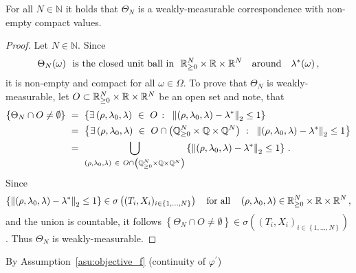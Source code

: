 \begin{lemma}
  \label{Theta_maes}
  For all $N\in\mathbb{N}$ it holds that 
  $\Theta_N$ is a weakly-measurable correspondence  with non-empty compact values.
\end{lemma}
\begin{proof}
  Let $N\in\mathbb{N}$. 
  Since 
  \begin{align*}
  \Theta_N(\omega)
  \ 
  \text{
  is the closed unit ball
  in
  }
  \ 
\R^N_{\ge 0}\times \R\times \R^N
\quad 
\text{around}
\quad 
  \lambda^*(\omega) 
  \,,
  \end{align*}
  it is non-empty and compact for all $\omega\in\Omega$.
  To prove that $\Theta_N$ is weakly-measurable,
  let 
  $
  O\subset
\mathbb{R}^N_{\ge 0}\times \mathbb{R}\times \mathbb{R}^N
  $
  be an open set and note, that
  \begin{align*}
    \left\{ 
      \Theta_N\cap O \neq \emptyset
    \right\}
    &
    \ 
    =
    \ 
    \left\{ 
      \exists
  \left( 
  \rho,\lambda_0,\lambda
  \right)
  \ 
  \in
  \ 
  O
\ 
\colon
\ 
\norm{
  \left( 
  \rho,\lambda_0,\lambda
  \right)
-\lambda^*}_2\le 1
    \right\}
    \\
    &
    \ 
    =
    \ 
    \left\{ 
      \exists
  \left( 
  \rho,\lambda_0,\lambda
  \right)
  \ 
  \in
  \ 
  O
  \cap
  \left( 
  \mathbb{Q}^N_{\ge 0}\times \mathbb{Q}\times \mathbb{Q}^N
  \right)
\ 
\colon
\ 
\norm{
  \left( 
  \rho,\lambda_0,\lambda
  \right)
-\lambda^*}_2\le 1
    \right\}
    \\
&
    \ 
    =
    \ 
    \bigcup_{
  \left( 
  \rho,\lambda_0,\lambda
  \right)
  \ 
  \in
  \ 
  O
  \cap
  \left( 
  \mathbb{Q}^N_{\ge 0}\times \mathbb{Q}\times \mathbb{Q}^N
  \right)
    }
    \left\{ 
\norm{
  \left( 
  \rho,\lambda_0,\lambda
  \right)
-\lambda^*}_2\le 1
    \right\}
    \,.
  \end{align*}
  Since
  \begin{align*}
    \left\{ 
\left\lVert
  \left( 
  \rho,\lambda_0,\lambda
  \right)
-\lambda^*\right\rVert_2\le 1
    \right\}
    \in
\sigma
\left( 
  (T_i,X_i)_{i\in 
\left\{ 1,\ldots,N \right\}
  } 
\right)
\quad
\text{for all}\quad
  \left( 
  \rho,\lambda_0,\lambda
  \right)
  \in
\mathbb{R}^N_{\ge 0}\times \mathbb{R}\times \mathbb{R}^N
\,,
  \end{align*}
  and the union is countable, it follows
  $
    \left\{ 
      \Theta_N\cap O \neq \emptyset
    \right\}
    \in
\sigma
\left( 
  (T_i,X_i)_{i\in 
\left\{ 1,\ldots,N \right\}
  } 
\right)
  $.
  Thus $\Theta_N$ is weakly-measurable.
\end{proof}
  By Assumption~\ref{asu:objective_f} (continuity of $\varphi^{'}$)

